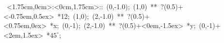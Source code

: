 \hbox{
\xy    <1.75cm,0cm>:<0cm,1.75cm>::
       (0,-1.0); (1,0) **\dir{-}  ?(0.5)+<-0.75em,0.5ex> *{12};
       (1,0); (2,-1.0) **\dir{-}  ?(0.5)+<0.75em,0ex> *{x};
       (0,-1); (2,-1.0) **\dir{-}    ?(0.5)+<0em,-1.5ex> *{y};
	   (0,-1)+<2em,1.5ex> *{\hbox{$45^{\circ}$}};
       \endxy}
